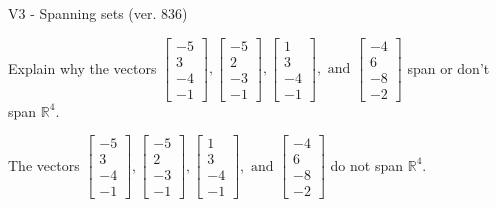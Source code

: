 \begin{exercise}
  \begin{exerciseTitle}V3 - Spanning sets (ver. 836)\end{exerciseTitle}
  \begin{exerciseStatement}
    Explain why the vectors \(\left[\begin{array}{r}
-5 \\
3 \\
-4 \\
-1
\end{array}\right] , \left[\begin{array}{r}
-5 \\
2 \\
-3 \\
-1
\end{array}\right] , \left[\begin{array}{r}
1 \\
3 \\
-4 \\
-1
\end{array}\right] , \text{ and } \left[\begin{array}{r}
-4 \\
6 \\
-8 \\
-2
\end{array}\right]\) span or don't span \(\mathbb{R}^4\). 
	


  \end{exerciseStatement}
  \begin{exerciseAnswer}
   The vectors \(\left[\begin{array}{r}
-5 \\
3 \\
-4 \\
-1
\end{array}\right] , \left[\begin{array}{r}
-5 \\
2 \\
-3 \\
-1
\end{array}\right] , \left[\begin{array}{r}
1 \\
3 \\
-4 \\
-1
\end{array}\right] , \text{ and } \left[\begin{array}{r}
-4 \\
6 \\
-8 \\
-2
\end{array}\right]\) 
  	 do not  
	span \(\mathbb{R}^4\).
  


  \end{exerciseAnswer}
\end{exercise}